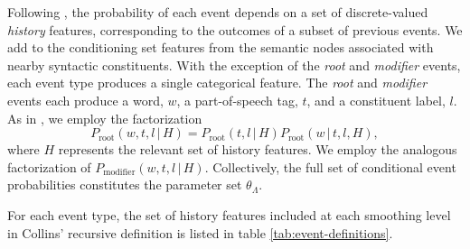 \documentclass[12pt,letterpaper]{report}
\newcommand{\given}{\, \vert \,}
\begin{document}
Following \citet{collins2003head}, the probability of each event
depends on a set of discrete-valued {\em history} features,
corresponding to the outcomes of a subset of previous events.  We add
to the conditioning set features from the semantic nodes associated
with nearby syntactic constituents.  With the exception of the {\em
  root} and {\em modifier} events, each event type produces a single
categorical feature.  The {\em root} and {\em modifier} events
each produce a word, $w$, a part-of-speech tag, $t$, and a constituent
label, $l$.  As in \citet{collins2003head}, we employ the
factorization
\begin{equation}
  \label{eq:2}
  P_{\mathrm{root}}(w,t,l\given H) = P_{\mathrm{root}}(t,l \given H)
  P_{\mathrm{root}}(w \given t,l,H),
\end{equation}
where $H$ represents the relevant set of history features.  We employ
the analogous factorization of $P_{\mathrm{modifier}}(w,t,l\given
H)$.  Collectively, the full set of conditional event probabilities
constitutes the parameter set $\theta_{\Lambda}$.

For each event type, the set of history features included at each
smoothing level in Collins' recursive definition is listed in table \ref{tab:event-definitions}.
\end{document}
